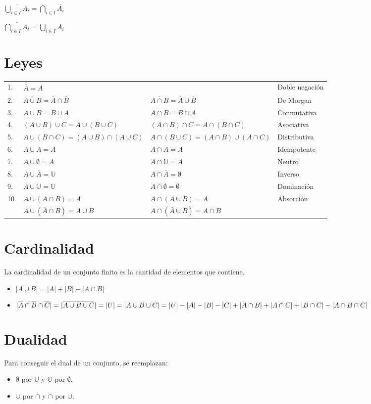 \documentclass[11pt,a4paper]{article}
\begin{document}
\begin{itemize}
\begin{multicols}{2}
\item $\overline{\displaystyle{\bigcup_{i \in I} A_i}} = \displaystyle{\bigcap_{i \in I} \overline{A_i}}$
\item $\overline{\displaystyle{\bigcap_{i \in I} A_i}} = \displaystyle{\bigcup_{i \in I} \overline{A_i}}$
\end{multicols}
\end{itemize}

\section{Leyes}
\begin{tabular}{p{}p{}p{}p{}}
1. & $\overline{\overline{A}} = A$ & & Doble negaci\'on \\
2. & $\overline{A \cup B} = \overline{A} \cap \overline{B}$ & $\overline{A \cap B} = \overline{A} \cup \overline{B}$ & De Morgan \\
3. & $A \cup B = B \cup A$ & $A \cap B = B \cap A$ & Conmutativa \\
4. & $(A\cup B) \cup C = A \cup (B \cup C)$ & $(A\cap B) \cap C = A \cap (B \cap C)$ & Asociativa \\
5. & $A \cup (B \cap C) = (A \cup B) \cap (A \cup C)$ & $A \cap (B \cup C) = (A \cap B) \cup (A \cap C)$ & Distributiva \\
6. & $A \cup A = A$ & $A \cap A = A$ & Idempotente \\
7. & $A \cup \emptyset = A$ & $A \cap \mathbb{U} = A$ & Neutro \\
8. & $A \cup \overline{A} = \mathbb{U}$ & $A \cap \overline{A} = \emptyset$ & Inverso \\
9. & $A \cup \mathbb{U} = \mathbb{U}$ & $A \cap \emptyset = \emptyset$ & Dominaci\'on \\
10. & $A \cup (A \cap B) = A$ & $A \cap (A \cup B) = A$ & Absorci\'on\\
    & $A \cup (\overline{A} \cap B) = A \cup B$ & $A \cap (\overline{A} \cup B) = A \cap B$
\end{tabular}


\section{Cardinalidad}
\noindent La cardinalidad de un conjunto finito es la cantidad de elementos que contiene.
\begin{itemize}
\item $|A\cup B| = |A| + |B| - |A \cap B|$
\item $|\overline{A} \cap \overline{B} \cap \overline{C}| = |\overline{A \cup B \cup C}| = |U| = |A \cup B \cup C|\\ = |U| - |A| - |B| - |C| + |A \cap B| + |A \cap C| + |B \cap C| - |A \cap B \cap C|$
\end{itemize}

\section{Dualidad}
\noindent Para conseguir el dual de un conjunto, se reemplazan:
\begin{itemize}
\item $\emptyset$ por $\mathbb{U}$ y $\mathbb{U}$ por $\emptyset$.
\item $\cup$ por $\cap$ y $\cap$ por $\cup$.
\end{itemize}
\end{document}
